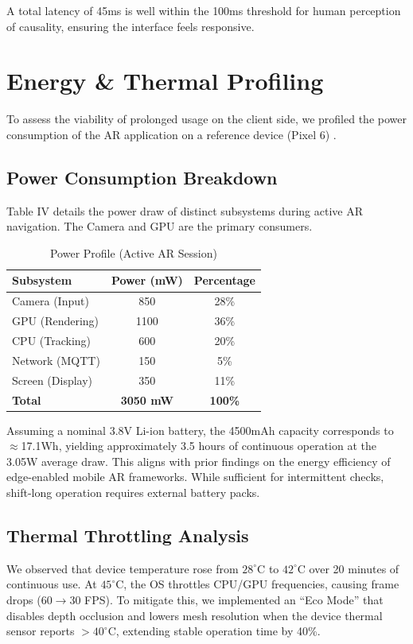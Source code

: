 \documentclass[conference]{IEEEtran}
\begin{document}
A total latency of 45ms is well within the 100ms threshold for human perception of causality, ensuring the interface feels responsive.

\section{Energy \& Thermal Profiling}
To assess the viability of prolonged usage on the client side, we profiled the power consumption of the AR application on a reference device (Pixel 6) \cite{b16}.

\subsection{Power Consumption Breakdown}
Table IV details the power draw of distinct subsystems during active AR navigation. The Camera and GPU are the primary consumers.

\begin{table}[htbp]
\caption{Power Profile (Active AR Session)}
\begin{center}
\begin{tabular}{lcc}
\toprule
\textbf{Subsystem} & \textbf{Power (mW)} & \textbf{Percentage} \\
\midrule
Camera (Input) & 850 & 28\% \\
GPU (Rendering) & 1100 & 36\% \\
CPU (Tracking) & 600 & 20\% \\
Network (MQTT) & 150 & 5\% \\
Screen (Display) & 350 & 11\% \\
\textbf{Total} & \textbf{3050 mW} & \textbf{100\%} \\
\bottomrule
\end{tabular}
\end{center}
\label{tab:power}
\end{table}

Assuming a nominal 3.8V Li-ion battery, the 4500mAh capacity corresponds to $\approx$17.1Wh, yielding approximately 3.5 hours of continuous operation at the 3.05W average draw. This aligns with prior findings on the energy efficiency of edge-enabled mobile AR frameworks. While sufficient for intermittent checks, shift-long operation requires external battery packs.

\subsection{Thermal Throttling Analysis}
We observed that device temperature rose from $28^\circ$C to $42^\circ$C over 20 minutes of continuous use. At $45^\circ$C, the OS throttles CPU/GPU frequencies, causing frame drops ($60 \to 30$ FPS). To mitigate this, we implemented an ``Eco Mode'' that disables depth occlusion and lowers mesh resolution when the device thermal sensor reports $>40^\circ$C, extending stable operation time by 40\%.
\end{document}
